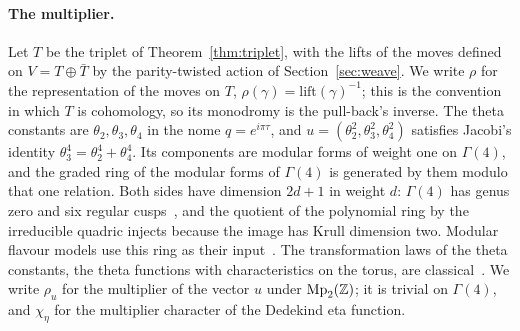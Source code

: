\paragraph{The multiplier.}
Let $T$ be the triplet of Theorem~\ref{thm:triplet}, with the lifts of the moves defined on $V=T\oplus\bar T$ by the
parity-twisted action of Section~\ref{sec:weave}. We write $\rho$ for the representation of the moves on $T$,
$\rho(\gamma)=\mathrm{lift}(\gamma)^{-1}$; this is the convention in which $T$ is cohomology, so its monodromy is
the pull-back's inverse. The theta constants are $\theta_2,\theta_3,\theta_4$ in the nome $q=e^{i\pi\tau}$, and
$u=(\theta_2^2,\theta_3^2,\theta_4^2)$ satisfies Jacobi's identity $\theta_3^4=\theta_2^4+\theta_4^4$. Its components are
modular forms of weight one on $\Gamma(4)$, and the graded ring of the modular forms of $\Gamma(4)$ is generated by them
modulo that one relation. Both sides have dimension $2d+1$ in weight $d$: $\Gamma(4)$ has genus zero and six regular
cusps~\cite[ch.~3]{DiamondShurman2005}, and the quotient of the polynomial ring by the irreducible quadric injects
because the image has Krull dimension two. Modular flavour models use this ring as their
input~\cite{NovichkovPenedoPetcov2021,LiuYaoDing2020}. The transformation laws of the theta constants,
the theta functions with characteristics on the torus, are classical~\cite{WhittakerWatson1927,AlvarezGaumeMooreVafa1986}.
We write $\rho_u$ for the multiplier of the vector $u$ under $\mathrm{Mp}_2(\mathbb{Z})$; it is trivial on $\Gamma(4)$, and
$\chi_\eta$ for the multiplier character of the Dedekind eta function.

